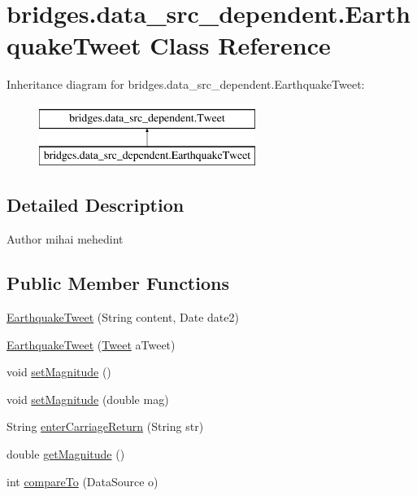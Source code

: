\hypertarget{classbridges_1_1data__src__dependent_1_1_earthquake_tweet}{}\section{bridges.\+data\+\_\+src\+\_\+dependent.\+Earthquake\+Tweet Class Reference}
\label{classbridges_1_1data__src__dependent_1_1_earthquake_tweet}
Inheritance diagram for bridges.\+data\+\_\+src\+\_\+dependent.\+Earthquake\+Tweet\+:\begin{figure}[H]
\begin{center}
\leavevmode
\includegraphics[height=2.000000cm]{classbridges_1_1data__src__dependent_1_1_earthquake_tweet}
\end{center}
\end{figure}


\subsection{Detailed Description}
\begin{DoxyAuthor}{Author}
mihai mehedint 
\end{DoxyAuthor}
\subsection*{Public Member Functions}
\begin{DoxyCompactItemize}
\item 
\mbox{\hyperlink{classbridges_1_1data__src__dependent_1_1_earthquake_tweet_a1f2d4634e85c75c59ba9d4aec878db54}{Earthquake\+Tweet}} (String content, Date date2)
\item 
\mbox{\hyperlink{classbridges_1_1data__src__dependent_1_1_earthquake_tweet_af0a8e9201997a7d4805f11c02f197410}{Earthquake\+Tweet}} (\mbox{\hyperlink{classbridges_1_1data__src__dependent_1_1_tweet}{Tweet}} a\+Tweet)
\item 
void \mbox{\hyperlink{classbridges_1_1data__src__dependent_1_1_earthquake_tweet_a49880f314eee430098ca347cd07ff470}{set\+Magnitude}} ()
\item 
void \mbox{\hyperlink{classbridges_1_1data__src__dependent_1_1_earthquake_tweet_a763d8a261a563e66af95c5a97850ecc0}{set\+Magnitude}} (double mag)
\item 
String \mbox{\hyperlink{classbridges_1_1data__src__dependent_1_1_earthquake_tweet_a3e39d6fa01f24cb259d32bb39108feb1}{enter\+Carriage\+Return}} (String str)
\item 
double \mbox{\hyperlink{classbridges_1_1data__src__dependent_1_1_earthquake_tweet_a8f3d92b4e60b922e996ecfaee3c5260e}{get\+Magnitude}} ()
\item 
int \mbox{\hyperlink{classbridges_1_1data__src__dependent_1_1_earthquake_tweet_a6b4de2a600b93ed96f6cde8b719ea645}{compare\+To}} (Data\+Source o)
\end{DoxyCompactItemize}



